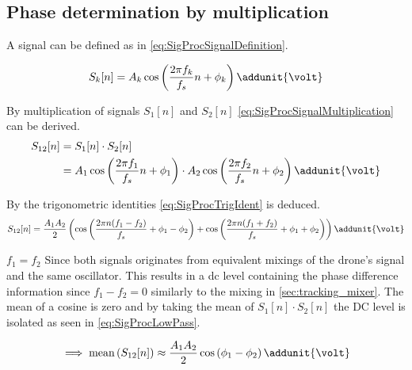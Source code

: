 \subsection{Phase determination by multiplication}\label{subsec:phaseDiff}
A signal can be defined as in \autoref{eq:SigProcSignalDefinition}. 


\begin{equation}\label{eq:SigProcSignalDefinition}
S_k[n]=A_k \cos \left(\frac{2\pi f_k}{ f_s} n+\phi_k \right)	\addunit{\volt}
\end{equation}
\startexplain
{}
\stopexplain

By multiplication of signals $S_1[n]$ and $S_2[n]$ \autoref{eq:SigProcSignalMultiplication} can be derived.
\begin{align}
S_{12}[n] &= S_1[n]\cdot S_2[n] \\
&= A_1 \cos \left(\frac{2\pi f_1}{ f_s} n+\phi_1 \right) \cdot A_2 \cos \left(\frac{2\pi f_2}{ f_s} n+\phi_2 \right) \addunit{\volt} \label{eq:SigProcSignalMultiplication}
\end{align}

By the trigonometric identities \autoref{eq:SigProcTrigIdent} is deduced.
\begin{equation}\label{eq:SigProcTrigIdent}
S_{12}[n]=\frac{A_1 A_2}{2}\left(  \cos \left(\frac{2\pi n ( f_1 - f_2)}{f_s}+ \phi_1 -\phi_2 \right) + \cos \left(\frac{2\pi n(f_1+f_2)}{ f_s} +\phi_1+\phi_2 \right)  \right) \addunit{\volt}
\end{equation}

$f_1 = f_2$ Since both signals originates from equivalent mixings of the drone's signal and the same oscillator. This results in a \gls{dc} level containing the phase difference information since $f_1 - f_2 = 0$ similarly to the mixing in \autoref{sec:tracking_mixer}. The mean of a cosine is zero and by taking the mean of $S_1[n]\cdot S_2[n]$ the DC level is isolated as seen in \autoref{eq:SigProcLowPass}.

\begin{equation}
	\implies \text{mean} \left( S_{12}[n]\right) \approx \frac{A_1 A_2}{2} \cos \left(  \phi_1-\phi_2 \right) \addunit{\volt}  \label{eq:SigProcLowPass}  \\ 
\end{equation}

